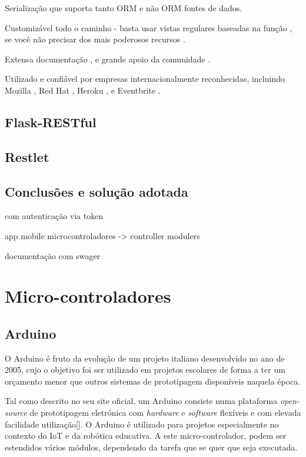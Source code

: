 Serialização que suporta tanto ORM e não ORM fontes de dados.

Customizável todo o caminho - basta usar vistas regulares baseadas na função , se você não  precisar dos mais poderosos recursos .

Extensa documentação , e grande apoio da comunidade .

Utilizado e confiável por empresas internacionalmente reconhecidas, incluindo Mozilla , 
Red Hat , Heroku , e Eventbrite .




\subsection{Flask-RESTful}


\subsection{Restlet}



\subsection{Conclusões e solução adotada}




com autenticação via token 







app mobile
microcontroladores -> controller modulers 


documentação com swager 





\newpage
\section{Micro-controladores}



\subsection{Arduino}


O Arduino é fruto da evolução de um projeto italiano desenvolvido no ano de 2005, cujo o objetivo foi ser utilizado em projetos escolares de forma a ter um orçamento menor que outros sistemas de prototipagem disponíveis naquela época.

Tal como descrito no seu site oficial, um Arduino consiste numa plataforma \textit{open-source} de prototipagem eletrónica com \textit{hardware} e \textit{software} flexíveis e com elevada facilidade utilização[]. O Arduino é utilizado para projetos especialmente no contexto do \ac{IoT} e da robótica educativa. A este micro-controlador, podem ser estendidos vários módulos, dependendo da tarefa que se quer que seja executada. 


